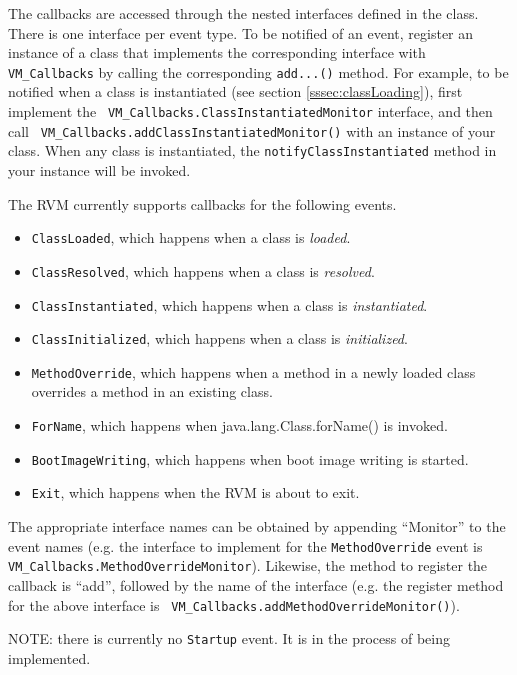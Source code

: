 The callbacks are accessed through the nested interfaces defined in the 
class.  There is one interface per event type.  To be notified
of an event, register an instance of a class that implements the corresponding
interface with {\tt VM\_Callbacks} by calling the corresponding {\tt add...()}
method.  For example, to be notified when a class is instantiated (see section
\ref{sssec:classLoading}), first implement the {\tt
VM\_Callbacks.ClassInstantiatedMonitor} interface, and then call {\tt
VM\_Callbacks.addClassInstantiatedMonitor()} with an instance of your class.
When any class is instantiated, the {\tt notifyClassInstantiated} method in
your instance will be invoked.

The RVM currently supports callbacks for the following events.
\begin{itemize}
\item {\tt ClassLoaded}, which happens when a class is {\em loaded}.
\item {\tt ClassResolved}, which happens when a class is {\em resolved}.
\item {\tt ClassInstantiated}, which happens when a class is {\em
instantiated}.
\item {\tt ClassInitialized}, which happens when a class is {\em initialized}.
\item {\tt MethodOverride}, which happens when a method in a newly loaded class
overrides a method in an existing class.
\item {\tt ForName}, which happens when java.lang.Class.forName() is invoked.
\item {\tt BootImageWriting}, which happens when boot image writing is started.
\item {\tt Exit}, which happens when the RVM is about to exit.
\end{itemize}
The appropriate interface names can be obtained by appending ``Monitor'' to the
event names (e.g. the interface to implement for the {\tt MethodOverride} event
is {\tt VM\_Callbacks.MethodOverrideMonitor}).  Likewise, the method to
register the callback is ``add'', followed by the name of the interface (e.g.
the register method for the above interface is {\tt
VM\_Callbacks.addMethodOverrideMonitor()}).

NOTE: there is currently no {\tt Startup} event.  It is in the process of being
implemented.

